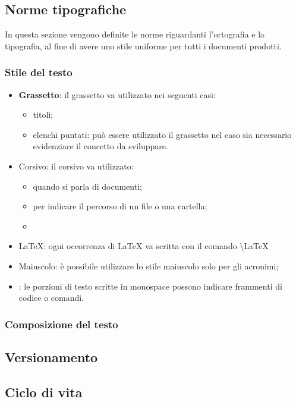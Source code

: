 	
	\subsection{Norme tipografiche}
	In questa sezione vengono definite le norme riguardanti l'ortografia e la tipografia, al fine di avere uno stile uniforme per tutti i documenti prodotti.
		\subsubsection{Stile del testo}
		\begin{itemize}
			\item \textbf{Grassetto}: il grassetto va utilizzato nei seguenti casi:
			\begin{itemize}
				\item titoli;
				\item elenchi puntati: può essere utilizzato il grassetto nel caso sia necessario evidenziare il concetto da sviluppare.
			\end{itemize}
			\item Corsivo: il corsivo va utilizzato:
			\begin{itemize}
				\item quando si parla di documenti;
				\item per indicare il percorso di un file o una cartella;
				\item 
			\end{itemize}
			\item \LaTeX: ogni occorrenza di \LaTeX{} va scritta con il comando \textbackslash LaTeX
			\item Maiuscolo: è possibile utilizzare lo stile maiuscolo solo per gli acronimi;
			\item {}: le porzioni di testo scritte in monospace possono indicare frammenti di codice o comandi.
		\end{itemize}
		\subsubsection{Composizione del testo}
	\subsection{Versionamento}
	\subsection{Ciclo di vita}
